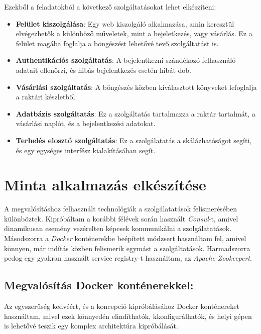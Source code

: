 \documentclass[11pt,magyar,a4paper,oneside,]{report}
\begin{document}
Ezekből a feladatokból a következő szolgáltatásokat lehet elkészíteni:

\begin{itemize}
\itemsep1pt\parskip0pt
\item
  \textbf{Felület kiszolgálása}: Egy web kiszolgáló alkalmazása, amin
  keresztül elvégezhetők a különböző műveletek, mint a bejeletkezés,
  vagy vásárlás. Ez a felület magába foglalja a böngészést lehetővé tevő
  szolgáltatást is.
\item
  \textbf{Authentikációs szolgáltatás}: A bejelentkezni szándékozó
  felhasználó adatait ellenőrzi, és hibás bejelentkezés esetén hibát
  dob.
\item
  \textbf{Vásárlási szolgáltatás}: A böngészés közben kiválasztott
  könyveket lefoglalja a raktári készletből.
\item
  \textbf{Adatbázis szolgáltatás}: Ez a szolgáltatás tartalmazza a
  raktár tartalmát, a vásárlási naplót, és a bejelentkezési adatokat.
\item
  \textbf{Terhelés elosztó szolgáltatás}: Ez a szolgálatatás a
  skálázhatóságot segíti, és egy egységes interfész kialakításában
  segít.
\end{itemize}

\chapter{Minta alkalmazás
elkészítése}\label{minta-alkalmazuxe1s-elkuxe9szuxedtuxe9se}

A megvalósításhoz felhasznált technológiák a szolgálatatások
felismerésében különböztek. Kipróbáltam a korábbi félévek során használt
\emph{Consul}-t, amivel dinamikusan esemény vezérelten képesek
kommunikálni a szolgálatatások. Másodszorra a \emph{Docker} konténerekbe
beépített módzsert használtam fel, amivel könnyen, már indítás közben
felismerik egymást a szolgáltatások. Harmadszorra pedog egy gyakran
használt service registry-t használtam, az \emph{Apache Zookeepert}.

\section{Megvalósítás Docker
konténerekkel:}\label{megvaluxf3suxedtuxe1s-docker-kontuxe9nerekkel}

Az egyszerűség kedvéért, és a koncepció kipróbálásához Docker
konténereket használtam, mivel ezek könnyedén elindíthatók,
kkonfigurálhatók, és helyi gépen is lehetővé teszik egy komplex
architektúra kipróbálását.
\end{document}

